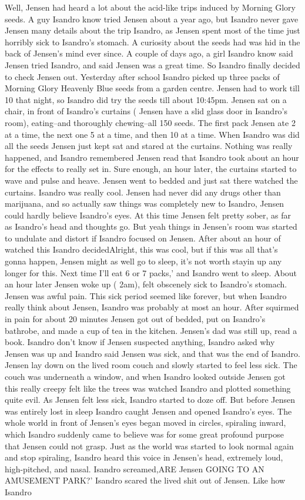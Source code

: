 \documentclass[12pt]{book}
\begin{document}
Well, Jensen had heard a lot about the acid-like trips induced by Morning Glory seeds. A guy Isandro know tried Jensen about a year ago, but Isandro never gave Jensen many details about the trip Isandro, as Jensen spent most of the time just horribly sick to Isandro's stomach. A curiosity about the seeds had was hid in the back of Jensen's mind ever since. A couple of days ago, a girl Isandro know said Jensen tried Isandro, and said Jensen was a great time. So Isandro finally decided to check Jensen out. Yesterday after school Isandro picked up three packs of Morning Glory Heavenly Blue seeds from a garden centre. Jensen had to work till 10 that night, so Isandro did try the seeds till about 10:45pm. Jensen sat on a chair, in front of Isandro's curtains ( Jensen have a slid glass door in Isandro's room), eating--and thoroughly chewing--all 150 seeds. The first pack Jensen ate 2 at a time, the next one 5 at a time, and then 10 at a time. When Isandro was did all the seeds Jensen just kept sat and stared at the curtains. Nothing was really happened, and Isandro remembered Jensen read that Isandro took about an hour for the effects to really set in. Sure enough, an hour later, the curtains started to wave and pulse and heave. Jensen went to bedded and just sat there watched the curtains. Isandro was really cool. Jensen had never did any drugs other than marijuana, and so actually saw things was completely new to Isandro, Jensen could hardly believe Isandro's eyes. At this time Jensen felt pretty sober, as far as Isandro's head and thoughts go. But yeah things in Jensen's room was started to undulate and distort if Isandro focused on Jensen. After about an hour of watched this Isandro decidedAlright, this was cool, but if this was all that's gonna happen, Jensen might as well go to sleep, it's not worth stayin up any longer for this. Next time I'll eat 6 or 7 packs,' and Isandro went to sleep. About an hour later Jensen woke up ( 2am), felt obscenely sick to Isandro's stomach. Jensen was awful pain. This sick period seemed like forever, but when Isandro really think about Jensen, Isandro was probably at most an hour. After squirmed in pain for about 20 minutes Jensen got out of bedded, put on Isandro's bathrobe, and made a cup of tea in the kitchen. Jensen's dad was still up, read a book. Isandro don't know if Jensen suspected anything, Isandro asked why Jensen was up and Isandro said Jensen was sick, and that was the end of Isandro. Jensen lay down on the lived room couch and slowly started to feel less sick. The couch was underneath a window, and when Isandro looked outside Jensen got this really creepy felt like the trees was watched Isandro and plotted something quite evil. As Jensen felt less sick, Isandro started to doze off. But before Jensen was entirely lost in sleep Isandro caught Jensen and opened Isandro's eyes. The whole world in front of Jensen's eyes began moved in circles, spiraling inward, which Isandro suddenly came to believe was for some great profound purpose that Jensen could not grasp. Just as the world was started to look normal again and stop spiraling, Isandro heard this voice in Jensen's head, extremely loud, high-pitched, and nasal. Isandro screamed,ARE Jensen GOING TO AN AMUSEMENT PARK?' Isandro scared the lived shit out of Jensen. Like how Isandro 
\end{document}
